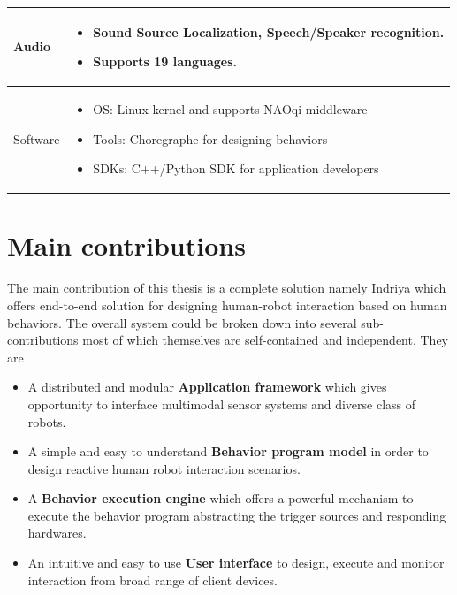 \begin{table}[H]
\begin{tabular}{ | l | p{12cm} |}
  Audio & \begin{itemize}[leftmargin=*,topsep={0pt},itemsep={0pt},partopsep={0pt},parsep={0pt}] \item Sound Source Localization, Speech/Speaker recognition. \item Supports 19 languages.\end{itemize} \\
                                          \hline
  Software & \begin{itemize}[leftmargin=*,topsep={0pt},itemsep={0pt},partopsep={0pt},parsep={0pt}] \item OS: Linux kernel and supports NAOqi middleware
  							\item Tools: Choregraphe \cite{pot2009choregraphe} for designing behaviors
  							\item SDKs: C++/Python SDK for application developers \end{itemize} \\
                                          \hline
    \end{tabular}
\end{table}

\section{Main contributions}
\label{sec:contributions}

The main contribution of this thesis is a complete solution namely Indriya which offers end-to-end solution for designing human-robot interaction based on human behaviors. The overall system could be broken down into several sub-contributions most of which themselves are self-contained and independent. They are

\begin{itemize}
\item A distributed and modular \textbf{Application framework} which gives opportunity to interface multimodal sensor systems and diverse class of robots.
\item A simple and easy to understand \textbf{Behavior program model} in order to design reactive human robot interaction scenarios.
\item A \textbf{Behavior execution engine} which offers a powerful mechanism to execute the behavior program abstracting the trigger sources and responding hardwares.
\item An intuitive and easy to use \textbf{User interface} to design, execute and monitor interaction from broad range of client devices.
\end{itemize}


